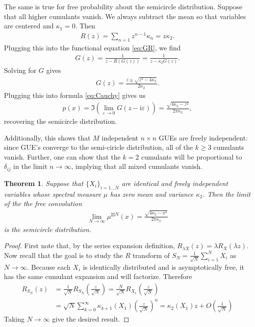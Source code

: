 \documentclass[11pt]{article}
\newcommand{\ii}{\mathrm i}
\renewcommand{\epsilon}{\varepsilon}
\newtheorem{theorem}{Theorem}
\theoremstyle{definition}
\begin{document}
The same is true for free probability about the semicircle distribution. Suppose that all higher cumulants vanish. We always subtract the mean so that variables are centered and $\kappa_1 = 0$. Then
\begin{align}
R(z) = \sum_{n=1}z^{n-1}\kappa_n = z\kappa_2.
\end{align}
Plugging this into the functional equation \eqref{eq:GR}, we find
\begin{align}
G(z) = \frac{1}{z-R(G(z))} = \frac{1}{z-\kappa_2 G(z)}.
\end{align}
Solving for $G$ gives
\begin{align}
G(z) = \frac{z \pm \sqrt{z^2-4\kappa_2}}{2\kappa_2}.
\end{align}
Plugging this into formula \eqref{eq:Cauchy} gives us
\begin{align}
p(x) = \Im(\lim_{\epsilon \to 0}G(z - \ii \epsilon)) = \frac{\sqrt{4\kappa_2-z^2}}{2\pi\kappa_2},
\end{align}
recovering the semicircle distribution.

Additionally, this shows that $M$ independent $n\times n$ GUEs are freely independent: since GUE's converge to the semi-ciricle distribution, all of the $k\geq 3$ cumulants vanish. Further, one can show that the $k=2$ cumulants will be proportional to $\delta_{ij}$ in the limit $n \to \infty$, implying that all mixed cumulants vanish.
\begin{theorem}
Suppose that $\{X_i\}_{i = 1\ldots N}$ are identical and freely independent variables whose spectral measure $\mu$ has zero mean and variance $\kappa_2$. Then the limit of the the free convolution
\begin{align}
\lim_{N\to \infty}\mu^{\boxtimes N}(x) = \frac{\sqrt{4\kappa_2-x^2}}{2\pi \kappa_2}
\end{align}
is the semicircle distribution.
\end{theorem}
\begin{proof}
    First note that, by the series expansion definition, $R_{\lambda X}(z)=\lambda R_X(\lambda z)$. Now recall that the goal is to study the $R$ transform of $S_N =\frac{1}{\sqrt{N}}\sum_{i=1}^{N}X_i$ as $N\to \infty $. Because each $X_i$ is identically distributed and is asymptotically free, it has the same cumulant expansion and will factorize. Therefore
    \begin{align}
      R_{S_N}(z) &=  \frac{1}{\sqrt{N}}R_{S_N}\left(\frac{z}{\sqrt{N}}\right)=\frac{N}{\sqrt{N}}R_{X_1}\left(\frac{z}{\sqrt{N}}\right)  \\
      &=\sqrt{N}  \sum_{k=0}^{\infty}\kappa_{k+1}(X_1)\left(\frac{z}{\sqrt{N}}\right)^n= \kappa_2(X_1)z +O\left(\frac{1}{\sqrt{N}}\right)
\end{align}
Taking $N\to \infty $ give the desired result.
\end{proof}






\nocite{*}
\end{document}
